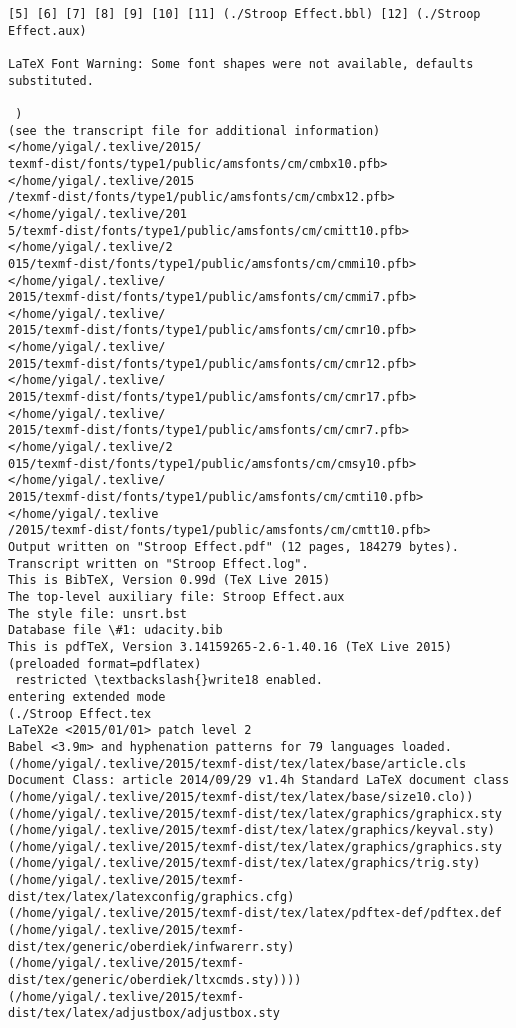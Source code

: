 \documentclass{article}
\begin{document}
\begin{Verbatim}[commandchars=\\\{\}]
[5] [6] [7] [8] [9] [10] [11] (./Stroop Effect.bbl) [12] (./Stroop Effect.aux)

LaTeX Font Warning: Some font shapes were not available, defaults substituted.

 )
(see the transcript file for additional information)</home/yigal/.texlive/2015/
texmf-dist/fonts/type1/public/amsfonts/cm/cmbx10.pfb></home/yigal/.texlive/2015
/texmf-dist/fonts/type1/public/amsfonts/cm/cmbx12.pfb></home/yigal/.texlive/201
5/texmf-dist/fonts/type1/public/amsfonts/cm/cmitt10.pfb></home/yigal/.texlive/2
015/texmf-dist/fonts/type1/public/amsfonts/cm/cmmi10.pfb></home/yigal/.texlive/
2015/texmf-dist/fonts/type1/public/amsfonts/cm/cmmi7.pfb></home/yigal/.texlive/
2015/texmf-dist/fonts/type1/public/amsfonts/cm/cmr10.pfb></home/yigal/.texlive/
2015/texmf-dist/fonts/type1/public/amsfonts/cm/cmr12.pfb></home/yigal/.texlive/
2015/texmf-dist/fonts/type1/public/amsfonts/cm/cmr17.pfb></home/yigal/.texlive/
2015/texmf-dist/fonts/type1/public/amsfonts/cm/cmr7.pfb></home/yigal/.texlive/2
015/texmf-dist/fonts/type1/public/amsfonts/cm/cmsy10.pfb></home/yigal/.texlive/
2015/texmf-dist/fonts/type1/public/amsfonts/cm/cmti10.pfb></home/yigal/.texlive
/2015/texmf-dist/fonts/type1/public/amsfonts/cm/cmtt10.pfb>
Output written on "Stroop Effect.pdf" (12 pages, 184279 bytes).
Transcript written on "Stroop Effect.log".
This is BibTeX, Version 0.99d (TeX Live 2015)
The top-level auxiliary file: Stroop Effect.aux
The style file: unsrt.bst
Database file \#1: udacity.bib
This is pdfTeX, Version 3.14159265-2.6-1.40.16 (TeX Live 2015) (preloaded format=pdflatex)
 restricted \textbackslash{}write18 enabled.
entering extended mode
(./Stroop Effect.tex
LaTeX2e <2015/01/01> patch level 2
Babel <3.9m> and hyphenation patterns for 79 languages loaded.
(/home/yigal/.texlive/2015/texmf-dist/tex/latex/base/article.cls
Document Class: article 2014/09/29 v1.4h Standard LaTeX document class
(/home/yigal/.texlive/2015/texmf-dist/tex/latex/base/size10.clo))
(/home/yigal/.texlive/2015/texmf-dist/tex/latex/graphics/graphicx.sty
(/home/yigal/.texlive/2015/texmf-dist/tex/latex/graphics/keyval.sty)
(/home/yigal/.texlive/2015/texmf-dist/tex/latex/graphics/graphics.sty
(/home/yigal/.texlive/2015/texmf-dist/tex/latex/graphics/trig.sty)
(/home/yigal/.texlive/2015/texmf-dist/tex/latex/latexconfig/graphics.cfg)
(/home/yigal/.texlive/2015/texmf-dist/tex/latex/pdftex-def/pdftex.def
(/home/yigal/.texlive/2015/texmf-dist/tex/generic/oberdiek/infwarerr.sty)
(/home/yigal/.texlive/2015/texmf-dist/tex/generic/oberdiek/ltxcmds.sty))))
(/home/yigal/.texlive/2015/texmf-dist/tex/latex/adjustbox/adjustbox.sty

\end{Verbatim}
\end{document}
